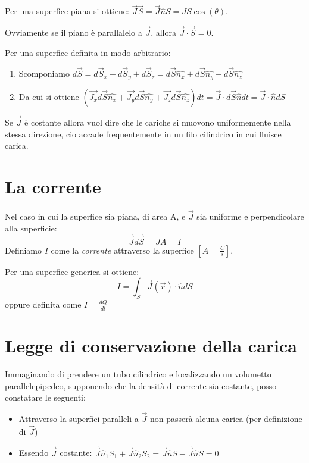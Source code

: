 \documentclass{book}
\begin{document}
Per una superfice piana si ottiene: $\vec{J} \vec{S} = \vec{J} \hat{n} S = JS \cos(\theta)$.

Ovviamente se il piano è parallalelo a $\vec{J}$, allora $\vec{J} \cdot \vec{S} = 0$.

Per una superfice definita in modo arbitrario:
\begin{enumerate}
  \item Scomponiamo $d\vec{S}=d\vec{S}_x + d\vec{S}_y + d\vec{S}_z =  d\vec{S}\hat{n_x} + d\vec{S} \hat{n_y} + d\vec{S} \hat{n_z}$
  \item Da cui si ottiene $\left(\vec{J_x}d\vec{S}\hat{n_x} + \vec{J_y}d\vec{S}\hat{n_y} + \vec{J_z}d\vec{S}\hat{n_z}\right) dt = \vec{J} \cdot d\vec{S} \hat{n}dt = \vec{J} \cdot \hat{n} dS$   
\end{enumerate}


Se $\vec{J}$ è costante allora vuol dire che le cariche si muovono uniformemente nella stessa direzione, cio accade frequentemente
in un filo cilindrico in cui fluisce carica.



\section{La corrente}
Nel caso in cui la superfice sia piana, di area A, e $\vec{J}$ sia uniforme e perpendicolare alla superficie: 
\[
\vec{J}d\vec{S}=JA=I
\]
Definiamo $I$ come la \emph{corrente} attraverso la superfice $\left[A=\frac{C}{s}\right]$.

Per una superfice generica si ottiene:
\[
I = \int_S \vec{J}(\vec{r}) \cdot \hat{n}d{S} 
\]
oppure definita come $I=\frac{dQ}{dt}$


\section{Legge di conservazione della carica}
Immaginando di prendere un tubo cilindrico e localizzando un volumetto parallelepipedeo, supponendo che la densità di corrente sia costante,
posso constatare le seguenti:
\begin{itemize}
  \item Attraverso la superfici paralleli a $\vec{J}$ non passerà alcuna carica (per definizione di $\vec{J}$)
  \item Essendo $\vec{J}$ costante: $\vec{J} \hat{n}_1 S_1 + \vec{J} \hat{n}_2 S_2 = \vec{J} \hat{n} S - \vec{J} \hat{n} S = 0 $
\end{itemize}
\end{document}
